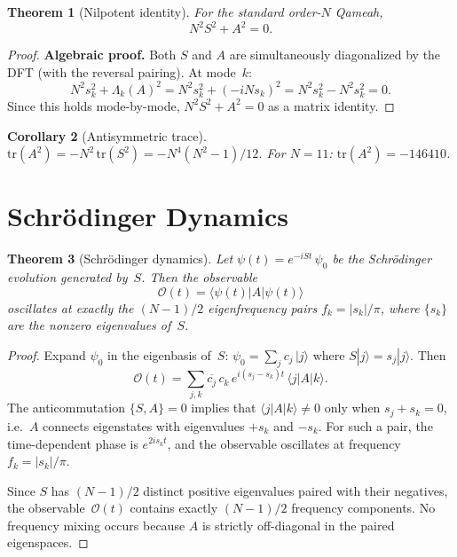 \documentclass[aip,jmp,reprint,superscriptaddress,floatfix,nofootinbib]{revtex4-2}
\newtheorem{theorem}{Theorem}
\newtheorem{corollary}[theorem]{Corollary}
\theoremstyle{definition}
\theoremstyle{remark}
\begin{document}
\begin{theorem}[Nilpotent identity]
\label{thm:nilpotent-identity}
For the standard order-$N$ Qameah,
\begin{equation}\label{eq:nilpotent-id}
  N^2 S^2 + A^2 = 0.
\end{equation}
\end{theorem}

\begin{proof}
\textbf{Algebraic proof.}
Both $S$ and $A$ are simultaneously diagonalized by the DFT (with
the reversal pairing).  At mode~$k$:
\[
  N^2 s_k^2 + \Lambda_k(A)^2 = N^2 s_k^2 + (-iNs_k)^2
  = N^2 s_k^2 - N^2 s_k^2 = 0.
\]
Since this holds mode-by-mode, $N^2 S^2 + A^2 = 0$ as a matrix identity.

\end{proof}

\begin{corollary}[Antisymmetric trace]
\label{cor:a-trace}
$\mathrm{tr}(A^2) = -N^2\,\mathrm{tr}(S^2) = -N^4(N^2{-}1)/12$.
For $N{=}11$: $\mathrm{tr}(A^2) = -146410$.
\end{corollary}

\section{Schr\"odinger Dynamics}
\label{sec:schrodinger}

\begin{theorem}[Schr\"odinger dynamics]
\label{thm:dynamics}
Let $\psi(t) = e^{-iSt}\,\psi_0$ be the Schr\"odinger evolution
generated by~$S$.  Then the observable
\begin{equation}\label{eq:dynamics-observable}
  \mathcal{O}(t) = \langle\psi(t)|A|\psi(t)\rangle
\end{equation}
oscillates at exactly the $(N{-}1)/2$ eigenfrequency pairs
$f_k = |s_k|/\pi$, where $\{s_k\}$ are the nonzero eigenvalues of~$S$.
\end{theorem}

\begin{proof}
Expand $\psi_0$ in the eigenbasis of~$S$: $\psi_0 = \sum_j c_j\,|j\rangle$
where $S|j\rangle = s_j|j\rangle$.  Then
\[
  \mathcal{O}(t) = \sum_{j,k} \overline{c_j}\,c_k\,
  e^{i(s_j - s_k)t}\,\langle j|A|k\rangle.
\]
The anticommutation $\{S,A\}=0$ implies that
$\langle j|A|k\rangle \neq 0$ only when $s_j + s_k = 0$, i.e.\
$A$ connects eigenstates with eigenvalues $+s_k$ and $-s_k$.  For
such a pair, the time-dependent phase is $e^{2is_k t}$, and the
observable oscillates at frequency $f_k = |s_k|/\pi$.

Since $S$ has $(N{-}1)/2$ distinct positive eigenvalues paired with
their negatives, the observable~$\mathcal{O}(t)$ contains exactly
$(N{-}1)/2$ frequency components.  No frequency mixing occurs because
$A$ is strictly off-diagonal in the paired eigenspaces.
\end{proof}
\end{document}
